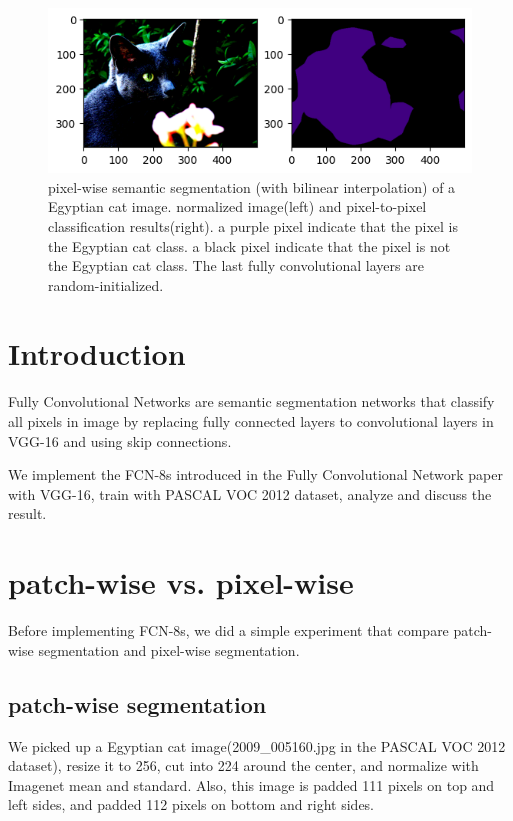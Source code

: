 \documentclass[extendedabs]{bmvc2k}
\begin{document}
\begin{figure}[t]
	\includegraphics[width=\linewidth]{images/fig3.png}
	\caption{
		pixel-wise semantic segmentation (with bilinear interpolation) of a Egyptian cat image. normalized image(left) and pixel-to-pixel classification results(right). a purple pixel indicate that the pixel is the Egyptian cat class. a black pixel indicate that the pixel is not the Egyptian cat class. The last fully convolutional layers are random-initialized.}
        \label{fig:pixel-wise-bilinear}
	\vspace{-2mm}
\end{figure}

\section{Introduction}
Fully Convolutional Networks\cite{fcn} are semantic segmentation networks that classify all pixels in image by replacing fully connected layers to convolutional layers in VGG-16\cite{vggnet} and using skip connections.

We implement the FCN-8s introduced in the Fully Convolutional Network paper\cite{fcn} with VGG-16, train with PASCAL VOC 2012 dataset, analyze and discuss the result.

\section{patch-wise vs. pixel-wise} \label{previousmodel}
Before implementing FCN-8s, we did a simple experiment that compare patch-wise segmentation and pixel-wise segmentation.
\subsection{patch-wise segmentation}\label{patchwisesec}
We picked up a Egyptian cat image(2009\_005160.jpg in the PASCAL VOC 2012 dataset), resize it to 256, cut into 224 around the center, and normalize with Imagenet mean and standard.
Also, this image is padded 111 pixels on top and left sides, and padded 112 pixels on bottom and right sides.
\end{document}
